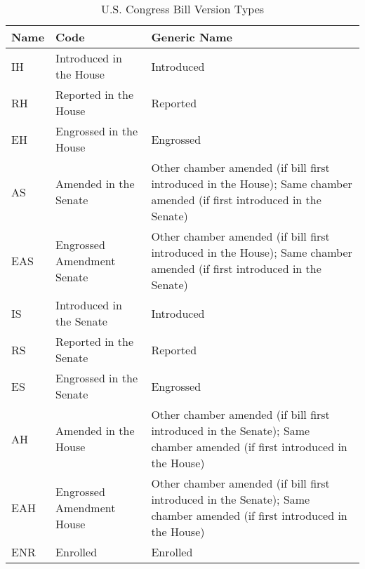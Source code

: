 \documentclass[10pt,a4paper]{article}
\begin{document}
\vspace*{2cm}

\begin{table}[!h]  \centering
\caption{U.S. Congress Bill Version Types}
\label{tab:billtypes}
\hspace*{-0.75cm}\begin{tabular}{llL{9.75cm}}
\textbf{Name} & \textbf{Code} &  \textbf{Generic Name} \\
\hline
{}
IH &  Introduced in the House & Introduced \\
RH & Reported in the House & Reported\\
EH & Engrossed in the House & Engrossed \\
AS & Amended in the Senate & Other chamber amended (if bill first introduced in the House); Same chamber amended (if first introduced in the Senate)\\
EAS & Engrossed Amendment Senate & Other chamber amended (if bill first introduced in the House); Same chamber amended (if first introduced in the Senate) \\
IS & Introduced in the Senate & Introduced \\
RS & Reported in the Senate & Reported\\
ES & Engrossed in the Senate & Engrossed \\
AH & Amended in the House & Other chamber amended (if bill first introduced in the Senate); Same chamber amended (if first introduced in the House)\\
EAH & Engrossed Amendment House & Other chamber amended (if bill first introduced in the Senate); Same chamber amended (if first introduced in the House) \\
ENR & Enrolled & Enrolled \\

\end{tabular}
\end{table}
\end{document}

